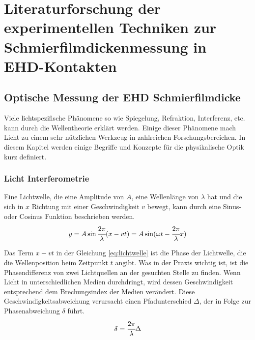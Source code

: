 \chapter{Literaturforschung der experimentellen Techniken zur Schmierfilmdickenmessung in EHD-Kontakten}
\label{chap:literaturforschung_der_experimentellen_technik_in_ehd_schmierung}

\section{Optische Messung der EHD Schmierfilmdicke}
\label{sec:optische_messung_der_ehd_schmierfilmdicke}

Viele lichtspezifische Phänomene so wie Spiegelung, Refraktion, Interferenz, etc. kann durch die Wellentheorie erklärt werden.
Einige dieser Phänomene mach Licht zu einem sehr nützlichen Werkzeug in zahlreichen Forschungsbereichen.
In diesem Kapitel werden einige Begriffe und Konzepte für die physikalische Optik kurz definiert.

\subsection{Licht Interferometrie}
\label{ssec:licht_interferometrie}

Eine Lichtwelle, die eine Amplitude von $A$, eine Wellenlänge von $\lambda$ hat und die sich in $x$ Richtung mit einer Geschwindigkeit $v$ bewegt, kann durch eine Sinus- oder Cosinus Funktion beschrieben werden.
\begin{equation}
        y = A \sin \cfrac{2 \pi}{\lambda} (x - v t) = A \sin (\omega t - \cfrac{2 \pi}{\lambda} x)
    \label{eq:lichtwelle}
\end{equation}
%

Das Term $x - v t$ in der Gleichung \ref{eq:lichtwelle} ist die Phase der Lichtwelle, die die Wellenposition beim Zeitpunkt $t$ angibt.
Was in der Praxis wichtig ist, ist die Phasendifferenz von zwei Lichtquellen an der gesuchten Stelle zu finden.
Wenn Licht in unterschiedlichen Medien durchdringt, wird dessen Geschwindigkeit entsprechend dem Brechungsindex der Medien verändert.
Diese Geschwindigkeitsabweichung verursacht einen Pfadunterschied $\Delta$, der in Folge zur Phasenabweichung $\delta$ führt.
\begin{equation}
    \delta = \cfrac{2 \pi}{\lambda} \Delta
    \label{eq:lichtwelle}
\end{equation}
%

